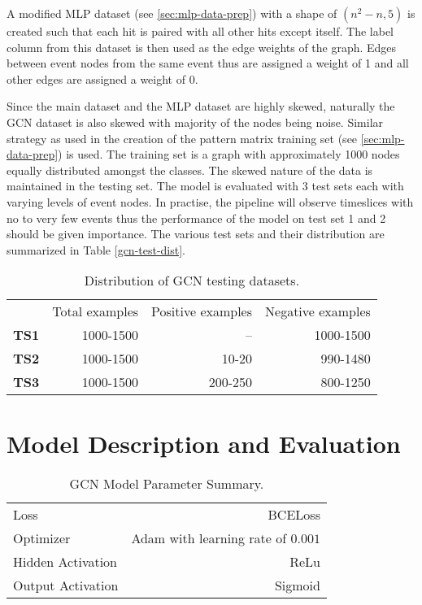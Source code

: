 A modified MLP dataset (see \ref{sec:mlp-data-prep}) with a shape of
\texttt{$(n^{2}-n, 5)$} is created such that each hit is paired with
all other hits except itself. The label column from this dataset is
then used as the edge weights of the graph. Edges between event nodes
from the same event thus are assigned a weight of 1 and all other
edges are assigned a weight of 0.

Since the main dataset and the MLP dataset are highly skewed,
naturally the GCN dataset is also skewed with majority of the nodes
being noise. Similar strategy as used in the creation of the pattern
matrix training set (see \ref{sec:mlp-data-prep}) is used. The
training set is a graph with approximately 1000 nodes equally
distributed amongst the classes. The skewed nature of the data is
maintained in the testing set. The model is evaluated with 3 test sets
each with varying levels of event nodes. In practise, the pipeline
will observe timeslices with no to very few events thus the
performance of the model on test set 1 and 2 should be given
importance. The various test sets and their distribution are
summarized in Table \ref{gcn-test-dist}.

\begin{table}[htb]
  \centering
  \caption{Distribution of GCN testing datasets.}
  \begin{tabular}{lrrr}
    & Total examples & Positive examples & Negative examples \\
    \textbf{TS1} & 1000-1500 & -- & 1000-1500 \\
    \textbf{TS2} & 1000-1500 & 10-20 & 990-1480 \\
    \textbf{TS3} & 1000-1500 & 200-250 & 800-1250 \\
  \end{tabular}
  \label{tab:gcn-test-dst}
\end{table}

\section{Model Description and Evaluation}
\label{sec:gcn-model-desc-eval}

\begin{table}[htb]
  \centering
  \begin{tabular}{lr}
    \hline
    Loss & BCELoss \\
    Optimizer & Adam with learning rate of $0.001$ \\
    Hidden Activation & ReLu \\
    Output Activation & Sigmoid \\
    \hline
  \end{tabular}
  \caption{GCN Model Parameter Summary.}
  \label{tab:gcn-model-param}
\end{table}

